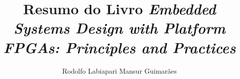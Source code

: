 \documentclass[bind,a4paper]{mythesis}
\begin{document}
\let\cleardoublepage\clearpage
\title{Resumo do Livro \textit{Embedded Systems Design with Platform FPGAs: Principles and Practices}}
\author{Rodolfo Labiapari Mansur Guimarães}%

\begin{frontmatter}
	
\end{frontmatter}

\begin{mainmatter}
  
	\let\cleardoublepage\clearpage
	
	
\end{mainmatter}

\begin{appendices}
\begin{flushleft}

\end{flushleft}
\end{appendices}
\let\cleardoublepage\clearpage
\begin{backmatter}
\end{backmatter}

\end{document}
